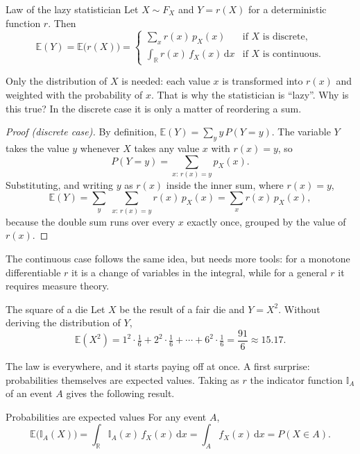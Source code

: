 \documentclass[a4paper,12pt,oneside]{report}
\begin{document}
\begin{framedthm}{Law of the lazy statistician}\label{thm:lazy}
Let $X\sim F_X$ and $Y=r(X)$ for a deterministic function $r$. Then
\[
\mathbb{E}(Y)=\mathbb{E}\big(r(X)\big)=
\begin{cases}
\displaystyle\sum_x r(x)\,p_X(x) & \text{if $X$ is discrete,}\\[2ex]
\displaystyle\int_{\mathbb{R}} r(x)\,f_X(x)\,\mathrm{d}x & \text{if $X$ is continuous.}
\end{cases}
\]
\end{framedthm}

Only the distribution of $X$ is needed: each value $x$ is transformed into
$r(x)$ and weighted with the probability of $x$. That is why the statistician
is ``lazy''. Why is this true? In the discrete case
it is only a matter of reordering a sum.

\begin{proof}[Proof (discrete case)]
By definition, $\mathbb{E}(Y)=\sum_y y\,P(Y=y)$. The variable $Y$ takes the
value $y$ whenever $X$ takes any value $x$ with $r(x)=y$, so
\[
P(Y=y)=\sum_{x:\,r(x)=y}p_X(x).
\]
Substituting, and writing $y$ as $r(x)$ inside the inner sum, where
$r(x)=y$,
\[
\mathbb{E}(Y)=\sum_y\;\sum_{x:\,r(x)=y} r(x)\,p_X(x)=\sum_x r(x)\,p_X(x),
\]
because the double sum runs over every $x$ exactly once, grouped by the value
of $r(x)$.
\end{proof}

The continuous case follows the same idea, but needs more tools: for a
monotone differentiable $r$ it is a change of variables in the integral,
while for a general $r$ it requires measure theory.

\begin{framedexample}{The square of a die}\label{ex:die-square}
Let $X$ be the result of a fair die and $Y=X^2$. Without deriving the
distribution of $Y$,
\[
\mathbb{E}(X^2)=1^2\cdot\tfrac16+2^2\cdot\tfrac16+\cdots+6^2\cdot\tfrac16
=\frac{91}{6}\approx15.17 .
\]
\end{framedexample}

The law is everywhere, and it starts paying off at once. A first surprise:
probabilities themselves are expected values. Taking as $r$ the indicator function
$\mathbb{I}_A$ of an event $A$ gives the following result.

\begin{framedcor}{Probabilities are expected values}\label{cor:prob-expected}
For any event $A$,
\[
\mathbb{E}\big(\mathbb{I}_A(X)\big)=\int_{\mathbb{R}} \mathbb{I}_A(x)\,f_X(x)\,\mathrm{d}x
=\int_A f_X(x)\,\mathrm{d}x=P(X\in A).
\]
\end{framedcor}
\end{document}

